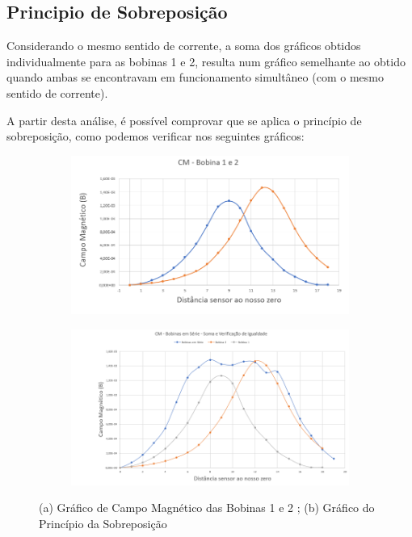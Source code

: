 \subsection*{Principio de Sobreposição}
\par Considerando o mesmo sentido de corrente, a soma dos gráficos obtidos individualmente para as bobinas 1 e 2, resulta num gráfico semelhante ao obtido quando ambas se encontravam em funcionamento simultâneo (com o mesmo sentido de corrente). \par
A partir desta análise, é possível comprovar que se aplica o princípio de sobreposição, como podemos verificar nos seguintes gráficos:
	
		\begin{figure}[H]
		\centering
		\begin{subfigure}[t]{0.45\textwidth}
			\centering
			\includegraphics[scale=0.3]{./bobinas1e2.png}
			\caption{}
		\end{subfigure}
		\begin{subfigure}[t]{0.45\textwidth}
			\centering
			{\includegraphics[scale=0.3]{./sobreposição.png}}
			\caption{}
			\end{subfigure}	
		\caption{(a) Gráfico de Campo Magnético das Bobinas 1 e 2 ; (b) Gráfico do Princípio da Sobreposição }
	\end{figure}
		
